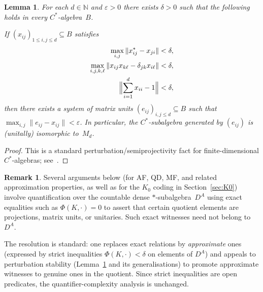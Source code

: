 \documentclass[12pt,fleqn,a4paper]{amsart}
\renewcommand{\le}{\leqslant}
\numberwithin{equation}{section}
\newtheorem{lemma}[theorem]{Lemma}
\theoremstyle{definition}
\newtheorem{remark}[theorem]{Remark}
\newcommand{\N}{\mathbb{N}}
\begin{document}
\begin{lemma}\label{lem:stable-fd}
For each $d\in\N$ and $\varepsilon>0$ there exists $\delta>0$ such that the following
holds in every $C^*$-algebra~$B$.

If $(x_{ij})_{1\le i,j\le d}\subseteq B$ satisfies
\[
\begin{aligned}
\max_{i,j}\|x_{ij}^*-x_{ji}\| &<\delta,\\
\max_{i,j,k,\ell}\|x_{ij}x_{k\ell}-\delta_{jk}x_{i\ell}\| &<\delta,\\
\Bigl\|\sum_{i=1}^d x_{ii}-1\Bigr\| &<\delta,
\end{aligned}
\]
then there exists a system of matrix units $(e_{ij})_{i,j\le d}\subseteq B$ such that
$\max_{i,j}\|e_{ij}-x_{ij}\|<\varepsilon$.
In particular, the $C^*$-subalgebra generated by $(e_{ij})$ is (unitally) isomorphic
to~$M_d$.
\end{lemma}

\begin{proof}
This is a standard perturbation/semiprojectivity fact for finite-dimensional
$C^*$-algebras; see~\cite{Loring}.
\end{proof}

\begin{remark}\label{rem:stable-relations}
Several arguments below (for AF, QD, MF, and related approximation properties, as well
as for the $K_0$ coding in Section~\ref{sec:K0}) involve quantification over the
countable dense $*$-subalgebra~$D^A$ using exact equalities such as $\Phi(K,\cdot)=0$
to assert that certain quotient elements are projections, matrix units, or unitaries.
Such exact witnesses need not belong to~$D^A$.

The resolution is standard: one replaces exact relations by \emph{approximate} ones
(expressed by strict inequalities $\Phi(K,\cdot)<\delta$ on elements of $D^A$) and
appeals to perturbation stability (Lemma~\ref{lem:stable-fd} and its generalisations)
to promote approximate witnesses to genuine ones in the quotient.
Since strict inequalities are open predicates, the quantifier-complexity analysis is
unchanged.
\end{remark}
\end{document}
